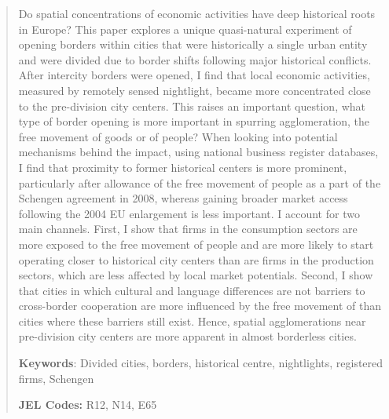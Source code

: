 \documentclass[12pt]{article}    %
\begin{document}
\begin{abstract}
\footnotesize
\par Do spatial concentrations of economic activities have deep historical roots in Europe?  This paper explores a unique quasi-natural experiment of opening borders within cities that were historically a single urban entity and were divided due to border shifts following major historical conflicts. After intercity borders were opened, I find that local economic activities, measured by remotely sensed nightlight, became more concentrated close to the pre-division city centers. This raises an important question, what type of border opening is more important in spurring agglomeration, the free movement of goods or of people? When looking into potential mechanisms behind the impact, using national business register databases, I find that proximity to former historical centers is more prominent, particularly after allowance of the free movement of people as a part of the Schengen agreement in 2008, whereas gaining broader market access following the 2004 EU enlargement is less important. I account for two main channels. First, I show that firms in the consumption sectors are more exposed to the free movement of people and are more likely to start operating closer to historical city centers than are firms in the production sectors, which are less affected by local market potentials. Second, I show that cities in which cultural and language differences are not barriers to cross-border cooperation are more influenced by the free movement of than cities where these barriers still exist. Hence, spatial agglomerations near pre-division city centers are more apparent in almost borderless cities. \renewcommand{\thefootnote}{} %
\par \textbf{Keywords}: Divided cities, borders, historical centre, nightlights, registered firms, Schengen
\par  \textbf{JEL Codes:}  R12, N14, E65 
\end{abstract}
\end{document}

